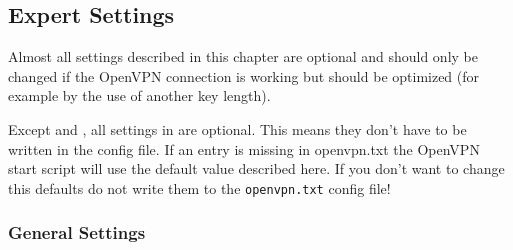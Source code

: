 \subsection{Expert Settings}

Almost all settings described in this chapter are optional and should only be 
changed if the OpenVPN connection is working but should be optimized 
(for example by the use of another key length).

Except  and ,
all settings in  are optional. This means they 
don't have to be written in the config file. If an entry is missing in 
openvpn.txt the OpenVPN start script will use the default value described 
here. If you don't want to change this defaults do not write them to the 
\texttt{openvpn.txt} config file!

\subsubsection{General Settings}

